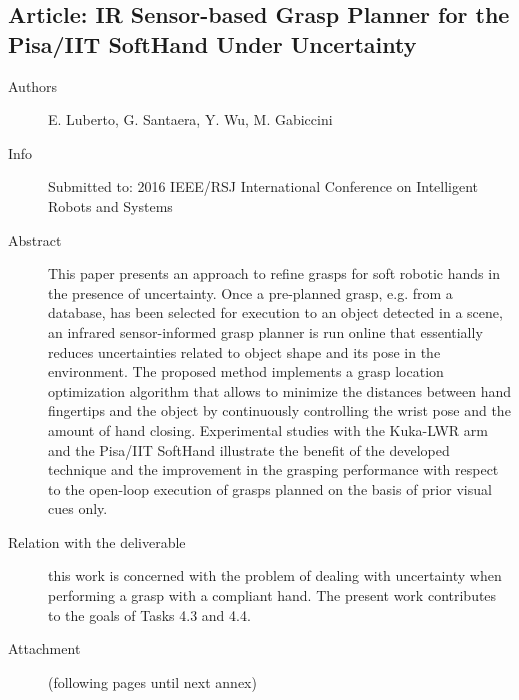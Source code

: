 \documentclass[a4paper,11pt,pdf]{pacmanreport}
\begin{document}

\subsection{Article: IR Sensor-based Grasp Planner for the Pisa/IIT SoftHand Under Uncertainty}
\label{ann:highLevelPlanning}
\begin{description}
    \item[Authors] E. Luberto, G. Santaera, Y. Wu, M. Gabiccini
    \item[Info] Submitted to: 2016 IEEE/RSJ International Conference on Intelligent Robots and Systems
    \item[Abstract] This paper presents an approach to refine grasps for soft robotic hands in the presence of uncertainty. Once a pre-planned grasp, e.g. from a database, has been selected for execution to an object detected in a scene, an infrared sensor-informed grasp planner is run online that essentially reduces uncertainties related to object shape and its pose in the environment. The proposed method implements a grasp location optimization algorithm that allows to minimize the distances between hand fingertips and the object by continuously controlling the wrist pose and the amount of hand closing. Experimental studies with the Kuka-LWR arm and the Pisa/IIT SoftHand illustrate the benefit of the developed technique and the improvement in the grasping performance with respect to the open-loop execution of grasps planned on the basis of prior visual cues only.
    \item[Relation with the deliverable] this work is concerned with the problem of dealing with uncertainty when performing a grasp with a compliant hand. The present work contributes to the goals of Tasks 4.3 and 4.4.
    \item[Attachment] (following pages until next annex)
\end{description}


\end{document}
